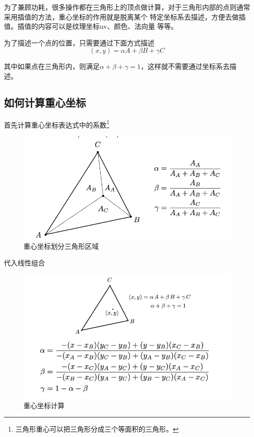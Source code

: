 为了兼顾功耗，很多操作都在三角形上的顶点做计算，对于三角形内部的点则通常采用插值的方法，重心坐标的作用就是脱离某个
特定坐标系去描述，方便去做插值。插值的内容可以是纹理坐标uv、颜色、法向量 等等。

为了描述一个点的位置，只需要通过下面方式描述
\begin{equation}
    (x,y)=\alpha A+\beta B+\gamma C
\end{equation}

其中如果点在三角形内，则满足$\alpha+\beta+\gamma=1$，这样就不需要通过坐标系去描述。

\subsection*{如何计算重心坐标}

首先计算重心坐标表达式中的系数\footnote{三角形重心可以把三角形分成三个等面积的三角形。}

\begin{figure}[H]
    \centering
    \includegraphics[scale=0.4]{figures/等面积三角形.png}
    \caption{重心坐标划分三角形区域}
\end{figure}

代入线性组合

\begin{figure}[H]
    \centering
    \includegraphics[scale=0.4]{figures/重心坐标2.png}
    \caption{重心坐标计算}
\end{figure}

